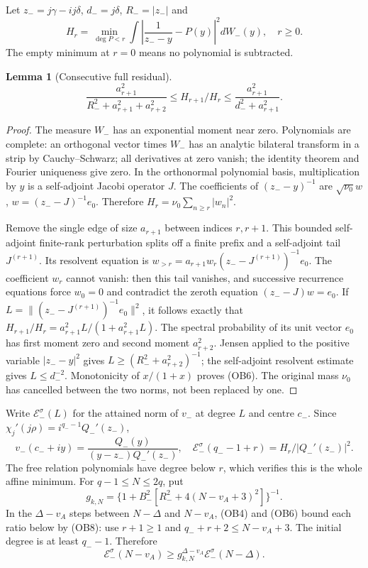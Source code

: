 \documentclass[11pt]{article}
\newtheorem{lemma}[theorem]{Lemma}
\theoremstyle{remark}\newtheorem{remark}[theorem]{Remark}
\begin{document}
Let $z_-=j\gamma-ij\delta$, $d_-=j\delta$, $R_-=|z_-|$ and
\[
 H_r=\min_{\deg P<r}\int\left|\frac1{z_--y}-P(y)\right|^2dW_-(y),
 \quad r\ge0.\tag{OB5}
\]
The empty minimum at $r=0$ means no polynomial is subtracted.
\begin{lemma}[Consecutive full residual]
\[
 \frac{a_{r+1}^2}{R_-^2+a_{r+1}^2+a_{r+2}^2}
 \le H_{r+1}/H_r\le
 \frac{a_{r+1}^2}{d_-^2+a_{r+1}^2}.\tag{OB6}
\]
\end{lemma}
\begin{proof}
The measure $W_-$ has an exponential moment near zero. Polynomials
are complete: an orthogonal vector times $W_-$ has an analytic
bilateral transform in a strip by Cauchy--Schwarz; all derivatives
at zero vanish; the identity theorem and Fourier uniqueness give zero.
In the orthonormal polynomial basis, multiplication by $y$ is a
self-adjoint Jacobi operator $J$. The coefficients of $(z_--y)^{-1}$
are $\sqrt{\nu_0}w$, $w=(z_--J)^{-1}e_0$. Therefore
$H_r=\nu_0\sum_{n\ge r}|w_n|^2$.

Remove the single edge of size $a_{r+1}$ between indices $r,r+1$.
This bounded self-adjoint finite-rank perturbation splits off a finite
prefix and a self-adjoint tail $J^{(r+1)}$. Its resolvent equation is
$w_{>r}=a_{r+1}w_r(z_--J^{(r+1)})^{-1}e_0$.
The coefficient $w_r$ cannot vanish: then this tail vanishes, and
successive recurrence equations force $w_0=0$ and contradict the
zeroth equation $(z_--J)w=e_0$.
If $L=\|(z_--J^{(r+1)})^{-1}e_0\|^2$, it follows exactly that
$H_{r+1}/H_r=a_{r+1}^2L/(1+a_{r+1}^2L)$.
The spectral probability of its unit vector $e_0$ has first moment
zero and second moment $a_{r+2}^2$. Jensen applied to the positive
variable $|z_--y|^2$ gives $L\ge(R_-^2+a_{r+2}^2)^{-1}$;
the self-adjoint resolvent estimate gives $L\le d_-^{-2}$.
Monotonicity of $x/(1+x)$ proves (OB6). The original mass $\nu_0$
has cancelled between the two norms, not been replaced by one.
\end{proof}

Write $\mathcal E_-^\sigma(L)$ for the attained norm of $v_-$ at
degree $L$ and centre $c_-$. Since
$\chi_j'(j\rho)=i^{q_--1}Q_-'(z_-)$,
\[
 v_-(c_-+iy)=\frac{Q_-(y)}{(y-z_-)Q_-'(z_-)},\quad
 \mathcal E_-^\sigma(q_--1+r)=H_r/|Q_-'(z_-)|^2.\tag{OB7}
\]
The free relation polynomials have degree below $r$, which verifies
this is the whole affine minimum. For $q-1\le N\le2q$, put
\[
 g_{k,N}=\{1+B_-^2[R_-^2+4(N-v_A+3)^2]\}^{-1}.\tag{OB8}
\]
In the $\Delta-v_A$ steps between $N-\Delta$ and $N-v_A$, (OB4)
and (OB6) bound each ratio below by (OB8): use $r+1\ge1$ and
$q_-+r+2\le N-v_A+3$. The initial degree is at least $q_--1$.
Therefore
\[
 \mathcal E_-^\sigma(N-v_A)\ge
 g_{k,N}^{\Delta-v_A}\mathcal E_-^\sigma(N-\Delta).\tag{OB9}
\]
\end{document}
